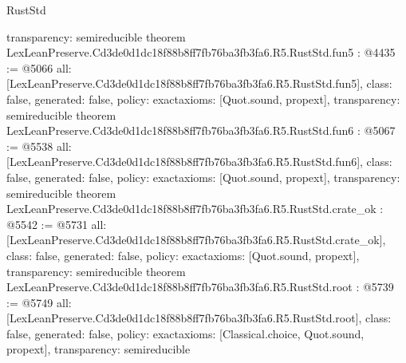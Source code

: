 \begin{lexlean}{RustStd}
\begin{coremodule}
{  transparency: semireducible
}
theorem LexLeanPreserve.Cd3de0d1dc18f88b8ff7fb76ba3fb3fa6.R5.RustStd.fun5 : @4435 := @5066 {
  all: [LexLeanPreserve.Cd3de0d1dc18f88b8ff7fb76ba3fb3fa6.R5.RustStd.fun5],
  class: false,
  generated: false,
  policy: exact{axioms: [Quot.sound, propext]},
  transparency: semireducible
}
theorem LexLeanPreserve.Cd3de0d1dc18f88b8ff7fb76ba3fb3fa6.R5.RustStd.fun6 : @5067 := @5538 {
  all: [LexLeanPreserve.Cd3de0d1dc18f88b8ff7fb76ba3fb3fa6.R5.RustStd.fun6],
  class: false,
  generated: false,
  policy: exact{axioms: [Quot.sound, propext]},
  transparency: semireducible
}
theorem LexLeanPreserve.Cd3de0d1dc18f88b8ff7fb76ba3fb3fa6.R5.RustStd.crate_ok : @5542 := @5731 {
  all: [LexLeanPreserve.Cd3de0d1dc18f88b8ff7fb76ba3fb3fa6.R5.RustStd.crate_ok],
  class: false,
  generated: false,
  policy: exact{axioms: [Quot.sound, propext]},
  transparency: semireducible
}
theorem LexLeanPreserve.Cd3de0d1dc18f88b8ff7fb76ba3fb3fa6.R5.RustStd.root : @5739 := @5749 {
  all: [LexLeanPreserve.Cd3de0d1dc18f88b8ff7fb76ba3fb3fa6.R5.RustStd.root],
  class: false,
  generated: false,
  policy: exact{axioms: [Classical.choice, Quot.sound, propext]},
  transparency: semireducible
}


\end{coremodule}
\end{lexlean}
